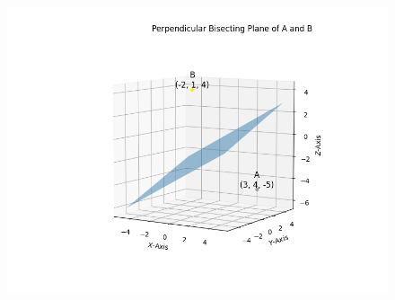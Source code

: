 \documentclass[journal]{IEEEtran}
\begin{document}
    \begin{figure}[h]
        \centering
       \includegraphics[width=0.7\linewidth]{figs/fig1.png}
       \caption{}
       \label{graph}
    \end{figure}
\end{document}

